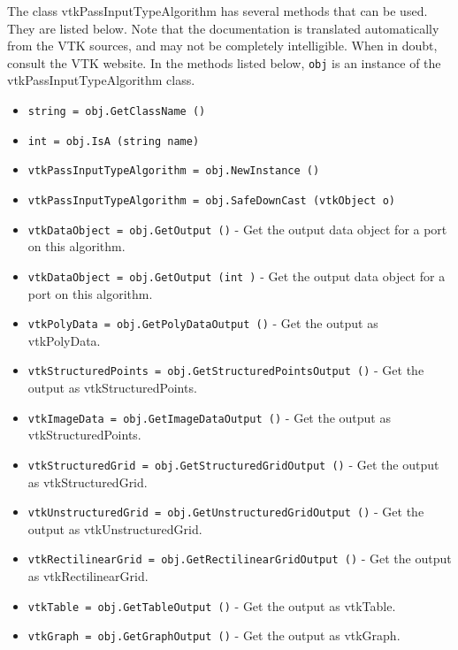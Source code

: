The class vtkPassInputTypeAlgorithm has several methods that can be used.
  They are listed below.
Note that the documentation is translated automatically from the VTK sources,
and may not be completely intelligible.  When in doubt, consult the VTK website.
In the methods listed below, \verb|obj| is an instance of the vtkPassInputTypeAlgorithm class.
\begin{itemize}
\item  \verb|string = obj.GetClassName ()|

\item  \verb|int = obj.IsA (string name)|

\item  \verb|vtkPassInputTypeAlgorithm = obj.NewInstance ()|

\item  \verb|vtkPassInputTypeAlgorithm = obj.SafeDownCast (vtkObject o)|

\item  \verb|vtkDataObject = obj.GetOutput ()| -  Get the output data object for a port on this algorithm.

\item  \verb|vtkDataObject = obj.GetOutput (int )| -  Get the output data object for a port on this algorithm.

\item  \verb|vtkPolyData = obj.GetPolyDataOutput ()| -  Get the output as vtkPolyData.

\item  \verb|vtkStructuredPoints = obj.GetStructuredPointsOutput ()| -  Get the output as vtkStructuredPoints.

\item  \verb|vtkImageData = obj.GetImageDataOutput ()| -  Get the output as vtkStructuredPoints.

\item  \verb|vtkStructuredGrid = obj.GetStructuredGridOutput ()| -  Get the output as vtkStructuredGrid.

\item  \verb|vtkUnstructuredGrid = obj.GetUnstructuredGridOutput ()| -  Get the output as vtkUnstructuredGrid.

\item  \verb|vtkRectilinearGrid = obj.GetRectilinearGridOutput ()| -  Get the output as vtkRectilinearGrid. 

\item  \verb|vtkTable = obj.GetTableOutput ()| -  Get the output as vtkTable.

\item  \verb|vtkGraph = obj.GetGraphOutput ()| -  Get the output as vtkGraph. 


\end{itemize}
